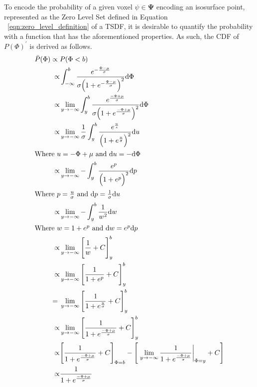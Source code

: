 To encode the probability of a given voxel \(\psi \in \bm{\Psi}\) encoding an
isosurface point, represented as the Zero Level Set defined in Equation
~\ref{eqn:zero_level_definition} of a TSDF, it is desirable to quantify the
probability with a function that has the aforementioned properties. As such, the
CDF of \(P{(\Phi)}^{\prime}\) is derived as follows.
\begin{align}
  \label{eqn:probobj_surface_prior_cdf}
  \bar{P}(\Phi) \propto{}& P(\Phi < b)\\
  \propto& \int_{-\infty}^{b} \frac
  {e^{-\frac{\Phi - \mu}{\sigma}}}
  {\sigma {\Big( 1 + e^{-\frac{\Phi - \mu}{\sigma}} \Big)}^{2}} {\mathrm d{\Phi}}\\
  \propto& \lim_{y\to -\infty} \int_{y}^{b} \frac
  {e^{\frac{-\Phi + \mu}{\sigma}}}
  {\sigma {\Big( 1 + e^{\frac{-\Phi + \mu}{\sigma}} \Big)}^{2}} {\mathrm d{\Phi}}\\
  \propto& \lim_{y\to -\infty} \frac{1}{\sigma} \int_{y}^{b}
  \frac{e^{\frac{u}{s}}}{{\Big( 1 + e^{\frac{u}{\sigma}} \Big)}^{2}} {\mathrm d{u}}\\
  \shortintertext{Where \( u = -\Phi + \mu \) and \({\mathrm d{u}} = -{\mathrm d{\Phi}}\)}
  \propto& \lim_{y\to -\infty} -\int_{y}^{b}
  \frac{e^{p}}{{\Big( 1 + e^{p} \Big)}^{2}} {\mathrm d{p}}\\
  \shortintertext{Where \(p = \frac{u}{\sigma}\) and \({\mathrm d{p}} = \frac{1}{\sigma} {\mathrm d{u}}\)}
  \propto& \lim_{y\to -\infty} -\int_{y}^{b} \frac{1}{w^{2}} {\mathrm d{w}}\\
  \shortintertext{Where \(w = 1 + e^{p}\) and \({\mathrm d{w}} = e^{p} {\mathrm d{p}}\)}
  \propto& \lim_{y\to -\infty} {\Bigg[ \frac{1}{w} + C \Bigg]}_{y}^{b}\\
  \propto& \lim_{y\to -\infty} {\Bigg[ \frac{1}{1 + e^{p}} + C \Bigg]}_{y}^{b}\\
  ={}& \lim_{y\to -\infty} {\Bigg[ \frac{1}{1 +e^{\frac{u}{\sigma}}} + C
  \Bigg]}_{y}^{b}\\
  \propto& \lim_{y\to -\infty} {\Bigg[ \frac{1}{1 + e^{\frac{-\Phi + \mu}{\sigma}}} +
  C \Bigg]}_{y}^{b}\\
  \propto& {\Bigg[ \frac{1}{1 + e^{\frac{-\Phi + \mu}{\sigma}}} + C \Bigg]}_{\Phi = b}
  - \Bigg[ \left. \lim_{y\to -\infty} \frac{1}{1 + e^{\frac{-\Phi + \mu}{\sigma}}}
  \right\rvert_{\Phi = y} + C \Bigg]\\
  \propto& \frac{1}{1 + e^{\frac{-\Phi + \mu}{\sigma}}}
\end{align}

